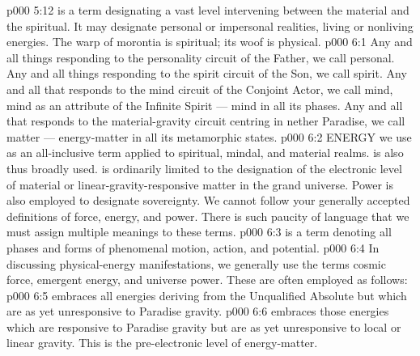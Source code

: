\vs p000 5:12 \pc {} is a term designating a vast level intervening between the material and the spiritual. It may designate personal or impersonal realities, living or nonliving energies. The warp of morontia is spiritual; its woof is physical.
\vs p000 6:1 Any and all things responding to the personality circuit of the Father, we call personal. Any and all things responding to the spirit circuit of the Son, we call spirit. Any and all that responds to the mind circuit of the Conjoint Actor, we call mind, mind as an attribute of the Infinite Spirit --- mind in all its phases. Any and all that responds to the material\hyp{}gravity circuit centring in nether Paradise, we call matter --- energy\hyp{}matter in all its metamorphic states.
\vs p000 6:2 \pc ENERGY we use as an all\hyp{}inclusive term applied to spiritual, mindal, and material realms.  is also thus broadly used.  is ordinarily limited to the designation of the electronic level of material or linear\hyp{}gravity\hyp{}responsive matter in the grand universe. Power is also employed to designate sovereignty. We cannot follow your generally accepted definitions of force, energy, and power. There is such paucity of language that we must assign multiple meanings to these terms.
\vs p000 6:3 \pc {} is a term denoting all phases and forms of phenomenal motion, action, and potential.
\vs p000 6:4 In discussing physical\hyp{}energy manifestations, we generally use the terms cosmic force, emergent energy, and universe power. These are often employed as follows:
\vs p000 6:5 \bibnobreakspace {} embraces all energies deriving from the Unqualified Absolute but which are as yet unresponsive to Paradise gravity.
\vs p000 6:6 \bibnobreakspace {} embraces those energies which are responsive to Paradise gravity but are as yet unresponsive to local or linear gravity. This is the pre\hyp{}electronic level of energy\hyp{}matter.

